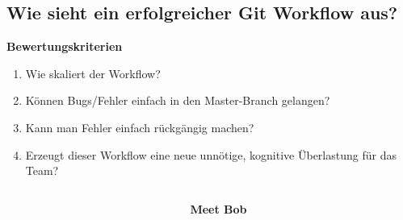 \subsection{Wie sieht ein erfolgreicher Git Workflow aus?}\label{subsec:wie-sieht-ein-erfolgreicher-git-workflow-aus?}
\begin{frame}[c]
    \slidehead
    \large
    \textbf{Bewertungskriterien}
    \normalsize
    \begin{enumerate}
        \item<2-> Wie skaliert der Workflow?
        \item<3-> Können Bugs/Fehler einfach in den Master-Branch gelangen?
        \item<4-> Kann man Fehler einfach rückgängig machen?
        \item<5-> Erzeugt dieser Workflow eine neue unnötige, kognitive Überlastung für das Team?
    \end{enumerate}
\end{frame}

\begin{frame}[c]
    \begin{columns}[c]
        \begin{column}{.5\textwidth}
            \centering
            
        \end{column}
        \begin{column}{.5\textwidth}
            \Large
            \textcolor{TUDa-8a}{\textbf{Meet Bob}}
        \end{column}
    \end{columns}
\end{frame}
